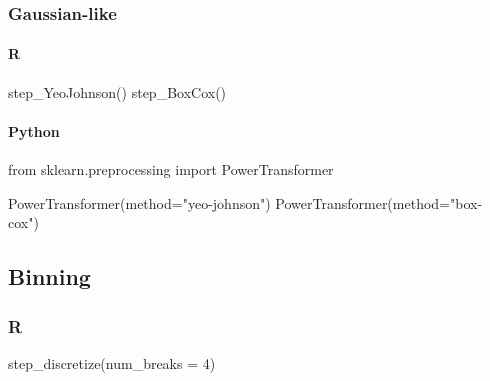 \documentclass[
  letterpaper,
  DIV=11,
  numbers=noendperiod]{scrreprt}
\newenvironment{Shaded}{\begin{snugshade}}{\end{snugshade}}
\newcommand{\AttributeTok}[1]{\textcolor[rgb]{0.40,0.46,0.14}{#1}}
\newcommand{\DecValTok}[1]{\textcolor[rgb]{0.68,0.00,0.00}{#1}}
\newcommand{\FunctionTok}[1]{\textcolor[rgb]{0.28,0.35,0.67}{#1}}
\newcommand{\ImportTok}[1]{\textcolor[rgb]{0.00,0.46,0.62}{#1}}
\newcommand{\NormalTok}[1]{\textcolor[rgb]{0.00,0.46,0.62}{#1}}
\newcommand{\OperatorTok}[1]{\textcolor[rgb]{0.37,0.37,0.37}{#1}}
\newcommand{\StringTok}[1]{\textcolor[rgb]{0.13,0.47,0.30}{#1}}
\let\oldparagraph\paragraph
\renewcommand{\paragraph}[1]{\oldparagraph{#1}\mbox{}}
\begin{document}
\hypertarget{gaussian-like}{%
\subsubsection{Gaussian-like}\label{gaussian-like}}

\hypertarget{r-64}{%
\paragraph{R}\label{r-64}}

\begin{Shaded}
\begin{Highlighting}[]
\FunctionTok{step\_YeoJohnson}\NormalTok{()}
\FunctionTok{step\_BoxCox}\NormalTok{()}
\end{Highlighting}
\end{Shaded}

\hypertarget{python-64}{%
\paragraph{Python}\label{python-64}}

\begin{Shaded}
\begin{Highlighting}[]
\ImportTok{from}\NormalTok{ sklearn.preprocessing }\ImportTok{import}\NormalTok{ PowerTransformer}

\NormalTok{PowerTransformer(method}\OperatorTok{=}\StringTok{"yeo{-}johnson"}\NormalTok{)}
\NormalTok{PowerTransformer(method}\OperatorTok{=}\StringTok{"box{-}cox"}\NormalTok{)}
\end{Highlighting}
\end{Shaded}

\hypertarget{binning}{%
\subsection{Binning}\label{binning}}

\hypertarget{r-65}{%
\subsubsection{R}\label{r-65}}

\begin{Shaded}
\begin{Highlighting}[]
\FunctionTok{step\_discretize}\NormalTok{(}\AttributeTok{num\_breaks =} \DecValTok{4}\NormalTok{)}
\end{Highlighting}
\end{Shaded}
\end{document}
